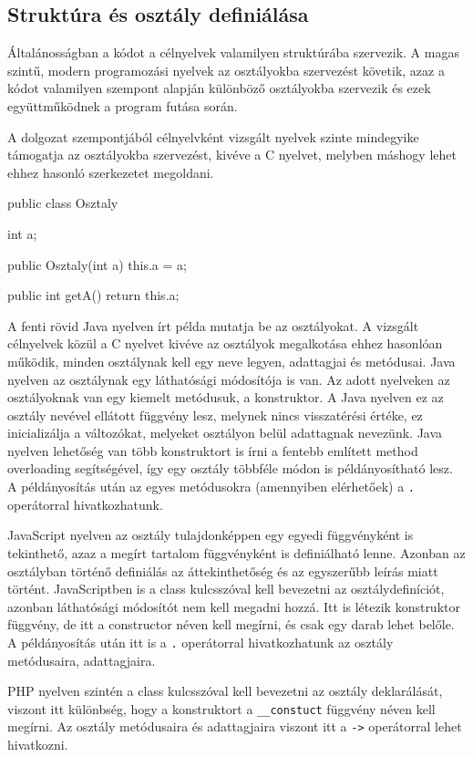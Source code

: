 \subsection{Struktúra és osztály definiálása}

Általánosságban a kódot a célnyelvek valamilyen struktúrába szervezik. A magas szintű, modern programozási nyelvek az osztályokba szervezést követik, azaz a kódot valamilyen szempont alapján különböző osztályokba szervezik és ezek együttműködnek a program futása során.

A dolgozat szempontjából célnyelvként vizsgált nyelvek szinte mindegyike támogatja az osztályokba szervezést, kivéve a C nyelvet, melyben máshogy lehet ehhez hasonló szerkezetet megoldani.
\begin{cpp}
	public class Osztaly {
		int a;
		
		public Osztaly(int a) {
			this.a = a;
		}
	
		public int getA() {
			return this.a;
		}
	}
\end{cpp}
A fenti rövid Java nyelven írt példa mutatja be az osztályokat. A vizsgált célnyelvek közül a C nyelvet kivéve az osztályok megalkotása ehhez hasonlóan működik, minden osztálynak kell egy neve legyen, adattagjai és metódusai. Java nyelven az osztálynak egy láthatósági módosítója is van. Az adott nyelveken az osztályoknak van egy kiemelt metódusuk, a konstruktor. A Java nyelven ez az osztály nevével ellátott függvény lesz, melynek nincs visszatérési értéke, ez inicializálja a változókat, melyeket osztályon belül adattagnak nevezünk. Java nyelven lehetőség van több konstruktort is írni a fentebb említett method overloading segítségével, így egy osztály többféle módon is példányosítható lesz.
A példányosítás után az egyes metódusokra (amennyiben elérhetőek) a \texttt{.} operátorral hivatkozhatunk.

JavaScript nyelven az osztály tulajdonképpen egy egyedi függvényként is tekinthető, azaz a megírt tartalom függvényként is definiálható lenne. Azonban az osztályban történő definiálás az áttekinthetőség és az egyszerűbb leírás miatt történt. JavaScriptben is a class kulcsszóval kell bevezetni az osztálydefiníciót, azonban láthatósági módosítót nem kell megadni hozzá. Itt is létezik konstruktor függvény, de itt a constructor néven kell megírni, és csak egy darab lehet belőle. A példányosítás után itt is a \texttt{.} operátorral hivatkozhatunk az osztály metódusaira, adattagjaira.

PHP nyelven szintén a class kulcsszóval kell bevezetni az osztály deklarálását, viszont itt különbség, hogy a konstruktort a \texttt{\_\_constuct} függvény néven kell megírni. Az osztály metódusaira és adattagjaira viszont itt a \texttt{->} operátorral lehet hivatkozni.

